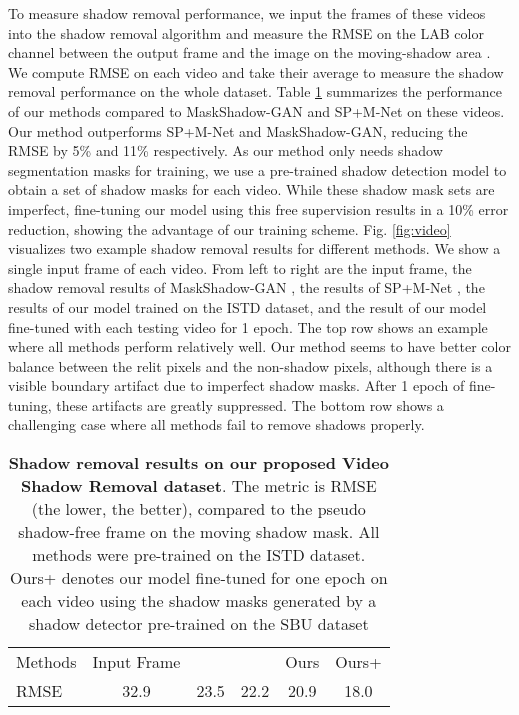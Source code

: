 \documentclass[runningheads]{llncs}
\begin{document}
To measure shadow removal performance, we input the frames of these videos into the shadow removal algorithm and measure the RMSE on the LAB color channel between the output frame and the image  on the moving-shadow area . We compute RMSE on each video and take their average to measure the shadow removal performance on the whole dataset. Table \ref{table:video} summarizes the performance of our methods compared to MaskShadow-GAN\cite{hu_iccv2019mask} and SP+M-Net\cite{Le-etal-ICCV19} on these videos. Our method outperforms SP+M-Net and MaskShadow-GAN, reducing the RMSE by 5\% and 11\% respectively. As our method only needs shadow segmentation masks for training, we use a pre-trained shadow detection model \cite{zhu18b} to obtain a set of shadow masks for each video. While these shadow mask sets are imperfect, fine-tuning our model using this free supervision results in  a 10\% error reduction, showing the advantage of our training scheme. Fig. \ref{fig:video} visualizes two example shadow removal results for different methods. We show a single input frame of each video. From left to right are the input frame, the shadow removal results of MaskShadow-GAN \cite{hu_iccv2019mask}, the results of SP+M-Net \cite{Le-etal-ICCV19}, the results of our model trained on the ISTD dataset, and the result of our model fine-tuned with each testing video for 1 epoch. The top row shows an example where all methods perform relatively well. Our method seems to have  better color balance between the relit pixels and the non-shadow pixels, although there is a visible boundary artifact due to imperfect shadow masks. After 1 epoch of fine-tuning, these artifacts are greatly suppressed. The bottom row shows a challenging case where all methods fail to remove shadows properly. 


\setlength{\tabcolsep}{4pt}
\begin{table}[t]
\begin{center}
\caption{\textbf{Shadow removal results on our proposed Video Shadow Removal dataset}. The metric is RMSE (the lower, the better), compared to the pseudo shadow-free frame on the moving shadow mask. All methods were pre-trained on the ISTD dataset.  Ours+ denotes our model fine-tuned for one epoch on each video using the shadow masks generated by a shadow detector \cite{zhu18b} pre-trained on the SBU dataset\cite{Vicente-et-al-CVPR16}}
\label{table:video}
\begin{tabular}{lccccc}
\hline\noalign{\smallskip}
Methods &Input Frame & \cite{hu_iccv2019mask}& \cite{Le-etal-ICCV19}& Ours & Ours+ \\ 
\noalign{\smallskip}
\midrule
\noalign{\smallskip}
RMSE  & 32.9 & 23.5 & 22.2 & 20.9 & 18.0\\
\hline
\end{tabular}
\end{center}
\end{table}
\end{document}
